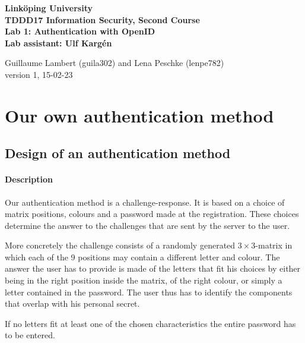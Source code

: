 \documentclass[11pt,a4paper]{article}
\begin{document}
	
\begin{center}
{\bfseries
Linköping University\\
TDDD17 Information Security, Second Course\\

Lab 1: Authentication with OpenID\\
Lab assistant: Ulf Kargén\\[10pt]}

Guillaume Lambert (guila302) and Lena Peschke (lenpe782)\\
version 1, 15-02-23
\end{center}

\hrulefill


\section*{Our own authentication method}
\subsection*{Design of an authentication method}
\paragraph{Description}

Our authentication method is a challenge-response. It is based on a choice of matrix positions, colours and a password made at the registration.
These choices determine the answer to the challenges that are sent by the server to the user.

More concretely the challenge consists of a randomly generated $3\times3$-matrix in which each of the 9 positions may contain a different letter and colour.
The answer the user has to provide is made of the letters that fit his choices by either being in the right position inside the matrix, of the right colour, or simply a letter contained in the password. The user thus has to identify the components that overlap with his personal secret.

If no letters fit at least one of the chosen characteristics the entire password has to be entered.
\end{document}
